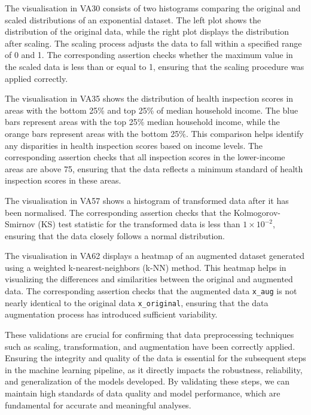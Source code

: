 The visualisation in VA30 consists of two histograms comparing the original and scaled distributions of an exponential dataset. The left plot shows the distribution of the original data, while the right plot displays the distribution after scaling. The scaling process adjusts the data to fall within a specified range of 0 and 1. The corresponding assertion checks whether the maximum value in the scaled data is less than or equal to 1, ensuring that the scaling procedure was applied correctly.

The visualisation in VA35 shows the distribution of health inspection scores in areas with the bottom 25\% and top 25\% of median household income. The blue bars represent areas with the top 25\% median household income, while the orange bars represent areas with the bottom 25\%. This comparison helps identify any disparities in health inspection scores based on income levels. The corresponding assertion checks that all inspection scores in the lower-income areas are above 75, ensuring that the data reflects a minimum standard of health inspection scores in these areas.

The visualisation in VA57 shows a histogram of transformed data after it has been normalised. The corresponding assertion checks that the Kolmogorov-Smirnov (KS) test statistic for the transformed data is less than $1 \times 10^{-2}$, ensuring that the data closely follows a normal distribution.

The visualisation in VA62 displays a heatmap of an augmented dataset generated using a weighted k-nearest-neighbors (k-NN) method. This heatmap helps in visualizing the differences and similarities between the original and augmented data. The corresponding assertion checks that the augmented data \lstinline{x_aug} is not nearly identical to the original data \lstinline{x_original}, ensuring that the data augmentation process has introduced sufficient variability.

These validations are crucial for confirming that data preprocessing techniques such as scaling, transformation, and augmentation have been correctly applied. Ensuring the integrity and quality of the data is essential for the subsequent steps in the machine learning pipeline, as it directly impacts the robustness, reliability, and generalization of the models developed. By validating these steps, we can maintain high standards of data quality and model performance, which are fundamental for accurate and meaningful analyses.


